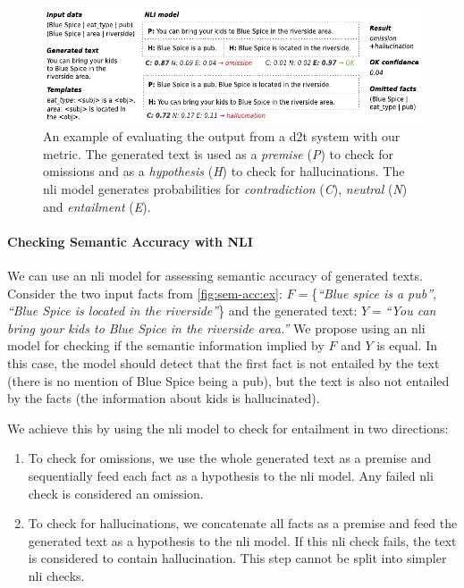 \begin{figure}[t]
    \centering
    \includegraphics[width=\textwidth]{img/2020_nli_inlg}
    \caption{An example of evaluating the output from a \ac{d2t} system with our metric. The generated text is used as a \textit{premise} (\textit{P}) to check for omissions and as a \textit{hypothesis} (\textit{H}) to check for hallucinations. The \ac{nli} model generates probabilities for \textit{contradiction} (\textit{C}), \textit{neutral} (\textit{N}) and \textit{entailment} (\textit{E}).}
    \label{fig:sem-acc:ex}
\end{figure}

\paragraph{Checking Semantic Accuracy with NLI} We can use an \ac{nli} model for assessing semantic accuracy of generated texts. Consider the two input facts from \autoref{fig:sem-acc:ex}: $F= $\{\emph{``Blue spice is a pub''}, \emph{``Blue Spice is located in the riverside''}\} and the generated text: $Y= $\emph{``You can bring your kids to Blue Spice in the riverside area.''} We propose using an \ac{nli} model for checking if the semantic information implied by $F$ and $Y$ is equal.
In this case, the model should detect that the first fact is not entailed by the text (there is no mention of Blue Spice being a pub), but the text is also not entailed by the facts (the information about kids is hallucinated).

We achieve this by using the \ac{nli} model to check for entailment in two directions:
\begin{enumerate}
    \item To check for \textrm{omissions}, we use the whole generated text as a premise and sequentially feed each fact as a hypothesis to the \ac{nli} model. Any failed \ac{nli} check is considered an omission.
    \item To check for \textrm{hallucinations}, we concatenate all facts as a premise and feed the generated text as a hypothesis to the \ac{nli} model. If this \ac{nli} check fails, the text is considered to contain hallucination. This step cannot be split into simpler \ac{nli} checks.
\end{enumerate}

